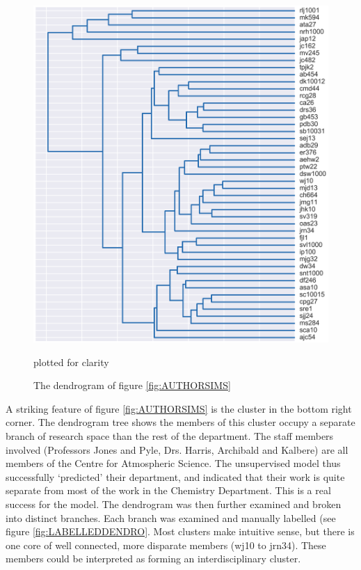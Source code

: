 \begin{center}
\begin{figure}[H]
  \centering
    \includegraphics[width=\textwidth]{Analysis/dendro.png}
    \caption{The dendrogram of figure \ref{fig:AUTHORSIMS}} plotted for clarity
\end{figure} 
\label{fig:DENDRO}

\end{center}
A striking feature of figure \ref{fig:AUTHORSIMS} is the cluster in the bottom right corner. The dendrogram tree shows the members of this cluster occupy a separate branch of research space than the rest of the department. The staff members involved (Professors Jones and Pyle, Drs. Harris, Archibald and Kalbere) are all members of the Centre for Atmospheric Science. The unsupervised model thus successfully `predicted' their department, and indicated that their work is quite separate from most of the work in the Chemistry Department. This is a real success for the model. The dendrogram was then further examined and broken into distinct branches. Each branch was examined and manually labelled (see figure \ref{fig:LABELLEDDENDRO}. Most clusters make intuitive sense, but there is one core of well connected, more disparate members (wj10 to jrn34). These members could be interpreted as forming an interdisciplinary cluster.  
